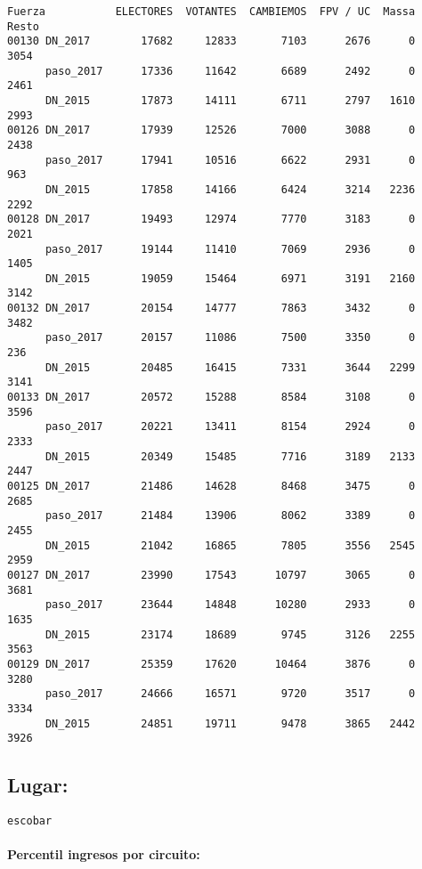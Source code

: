 \documentclass[11pt]{article}
\begin{document}
    \begin{verbatim}
Fuerza           ELECTORES  VOTANTES  CAMBIEMOS  FPV / UC  Massa  Resto
00130 DN_2017        17682     12833       7103      2676      0   3054
      paso_2017      17336     11642       6689      2492      0   2461
      DN_2015        17873     14111       6711      2797   1610   2993
00126 DN_2017        17939     12526       7000      3088      0   2438
      paso_2017      17941     10516       6622      2931      0    963
      DN_2015        17858     14166       6424      3214   2236   2292
00128 DN_2017        19493     12974       7770      3183      0   2021
      paso_2017      19144     11410       7069      2936      0   1405
      DN_2015        19059     15464       6971      3191   2160   3142
00132 DN_2017        20154     14777       7863      3432      0   3482
      paso_2017      20157     11086       7500      3350      0    236
      DN_2015        20485     16415       7331      3644   2299   3141
00133 DN_2017        20572     15288       8584      3108      0   3596
      paso_2017      20221     13411       8154      2924      0   2333
      DN_2015        20349     15485       7716      3189   2133   2447
00125 DN_2017        21486     14628       8468      3475      0   2685
      paso_2017      21484     13906       8062      3389      0   2455
      DN_2015        21042     16865       7805      3556   2545   2959
00127 DN_2017        23990     17543      10797      3065      0   3681
      paso_2017      23644     14848      10280      2933      0   1635
      DN_2015        23174     18689       9745      3126   2255   3563
00129 DN_2017        25359     17620      10464      3876      0   3280
      paso_2017      24666     16571       9720      3517      0   3334
      DN_2015        24851     19711       9478      3865   2442   3926
    \end{verbatim}

    
    \hypertarget{lugar}{%
\subsection{Lugar:}\label{lugar}}

    
    \begin{Verbatim}[commandchars=\\\{\}]
escobar

    \end{Verbatim}

    \hypertarget{percentil-ingresos-por-circuito}{%
\paragraph{Percentil ingresos por
circuito:}\label{percentil-ingresos-por-circuito}}
\end{document}
